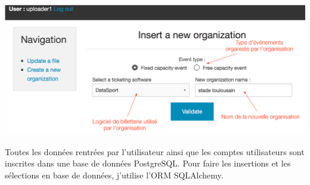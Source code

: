 \begin{center}
\includegraphics[scale=0.55]{images/front2.png}
\label{front_orga}
\end{center}

Toutes les données rentrées par l'utilisateur ainsi que les comptes utilisateurs sont inscrites dans une base de données PostgreSQL. Pour faire les insertions et les sélections en base de données, j'utilise l'ORM SQLAlchemy.

